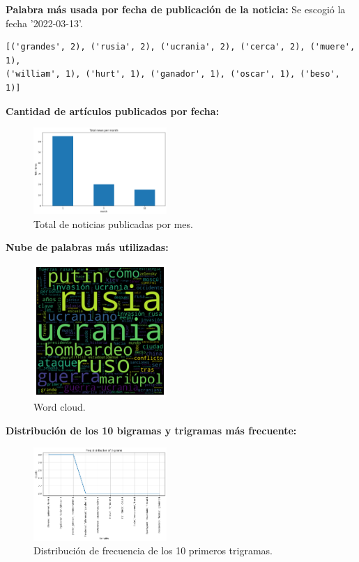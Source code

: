 \textbf{Palabra más usada por fecha de publicación de la noticia:}
Se escogió la fecha '2022-03-13'.

\begin{verbatim}
[('grandes', 2), ('rusia', 2), ('ucrania', 2), ('cerca', 2), ('muere', 1), 
('william', 1), ('hurt', 1), ('ganador', 1), ('oscar', 1), ('beso', 1)]
\end{verbatim}


\textbf{Cantidad de artículos publicados por fecha:}

\begin{figure}[!ht]
    \centering
    \includegraphics[width=0.45\textwidth]{figures/news_per_date.png}
    \caption{Total de noticias publicadas por mes.}
    \label{fig:eje2}
\end{figure}

\textbf{Nube de palabras más utilizadas:}

\begin{figure}[!ht]
    \centering
    \includegraphics[width=0.45\textwidth]{figures/wordcloud.png}
    \caption{Word cloud.}
    \label{fig:eje2_1}
\end{figure}

\textbf{Distribución de los 10 bigramas y trigramas más frecuente:}

\begin{figure}[!ht]
    \centering
    \includegraphics[width=0.45\textwidth]{figures/top_10_3grams_dist.png}
    \caption{Distribución de frecuencia de los 10 primeros trigramas.}
    \label{fig:eje2_2}
\end{figure} 

